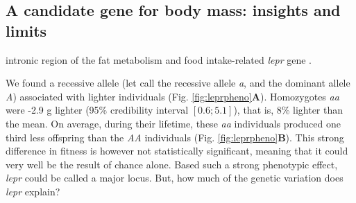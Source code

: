 \subsection{A candidate gene for body mass: insights and limits}

intronic region of the fat metabolism and food intake-related \emph{lepr} gene \parencite{Houseknecht1998}.

We found a recessive allele (let call the recessive allele \emph{a}, and the dominant allele \emph{A}) associated with lighter individuals (Fig. \ref{fig:leprpheno}\textbf{A}). Homozygotes \emph{aa} were -2.9 g lighter (95\% credibility interval $[0.6;5.1]$), that is, 8\% lighter than the mean. On average, during their lifetime, these \emph{aa} individuals produced one third less offspring than the \emph{AA} individuals (Fig. \ref{fig:leprpheno}\textbf{B}). This strong difference in fitness is however not statistically significant, meaning that it could very well be the result of chance alone. Based such a strong phenotypic effect, \emph{lepr} could be called a major locus. But, how much of the genetic variation does \emph{lepr} explain?

